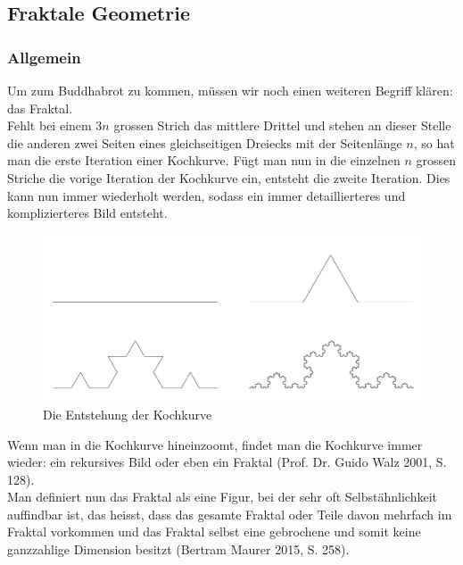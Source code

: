 \subsection{Fraktale Geometrie}
\subsubsection{Allgemein}
Um zum Buddhabrot zu kommen, müssen wir noch einen weiteren Begriff klären: das Fraktal.\\ Fehlt bei einem 3$n$ grossen Strich das mittlere Drittel und stehen an dieser Stelle die anderen zwei Seiten eines gleichseitigen Dreiecks mit der Seitenlänge $n$, so hat man die erste Iteration einer Kochkurve. Fügt man nun in die einzelnen $n$ grossen Striche die vorige Iteration der Kochkurve ein, entsteht die zweite Iteration. Dies kann nun immer wiederholt werden, sodass ein immer detaillierteres und komplizierteres Bild entsteht.\\
\begin{figure}[h]
    \centering
    \includegraphics[width=.5\textwidth]{Pictures/Kochkurve.png}
    \caption[Kochkurve (eigenes Bild)]{Die Entstehung der Kochkurve}
    \label{fig:Kochkurve}
\end{figure}
Wenn man in die Kochkurve hineinzoomt, findet man die Kochkurve immer wieder: ein rekursives Bild oder eben ein Fraktal (Prof. Dr. Guido Walz 2001, S. 128).\\Man definiert nun das Fraktal als eine Figur, bei der sehr oft Selbstähnlichkeit auffindbar ist, das heisst, dass das gesamte Fraktal oder Teile davon mehrfach im Fraktal vorkommen und das Fraktal selbst eine gebrochene und somit keine ganzzahlige Dimension besitzt (Bertram Maurer 2015, S. 258).\\

